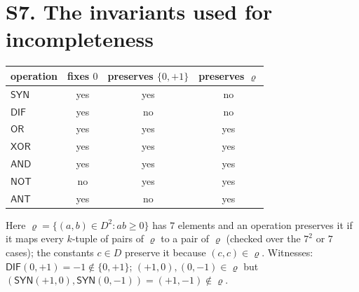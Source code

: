 \documentclass[10pt,a4paper]{article}
\newcommand{\D}{D}\newcommand{\Z}{\mathcal Z}\newcommand{\SYN}{\mathsf{SYN}}\newcommand{\DIF}{\mathsf{DIF}}\newcommand{\OR}{\mathsf{OR}}\newcommand{\XOR}{\mathsf{XOR}}\newcommand{\AND}{\mathsf{AND}}\newcommand{\NOT}{\mathsf{NOT}}\newcommand{\ANT}{\mathsf{ANT}}\newcommand{\MAX}{\mathsf{MAX}}\newcommand{\MIN}{\mathsf{MIN}}\newcommand{\MAG}{\mathsf{MAG}}\newcommand{\chai}{Chai}\newcommand{\Fone}{\mathcal F_1}\newcommand{\Ftwo}{\mathcal F_2}\usepackage{tikz}\usetikzlibrary{arrows.meta,positioning}\newcommand{\yang}{\rule{0.8em}{0.18ex}}\newcommand{\yin}{\rule{0.25em}{0.18ex}\hspace{0.3em}\rule{0.25em}{0.18ex}}\newcommand{\tri}[3]{\raisebox{-0.01ex}{\shortstack[c]{#1\\[-0.3ex]#2\\[-0.3ex]#3}}}\newcommand{\iv}[1]{[\![#1]\!]}
\begin{document}
\section*{S7. The invariants used for incompleteness}
\begin{center}\small\begin{tabular}{lccc}\toprule operation&fixes $0$&preserves $\{0,+1\}$&preserves $\varrho$\\\midrule
$\SYN$&yes&yes&no\\
$\DIF$&yes&no&no\\
$\OR$&yes&yes&yes\\
$\XOR$&yes&yes&yes\\
$\AND$&yes&yes&yes\\
$\NOT$&no&yes&yes\\
$\ANT$&yes&no&yes\\
\bottomrule\end{tabular}\end{center}
Here $\varrho=\{(a,b)\in\D^2:ab\ge0\}$ has $7$ elements and an operation preserves it if it maps every $k$-tuple of pairs of $\varrho$ to a pair of $\varrho$ (checked over the $7^2$ or $7$ cases); the constants $c\in\D$ preserve it because $(c,c)\in\varrho$. Witnesses: $\DIF(0,+1)=-1\notin\{0,+1\}$; $(+1,0),(0,-1)\in\varrho$ but $(\SYN(+1,0),\SYN(0,-1))=(+1,-1)\notin\varrho$.
\end{document}
